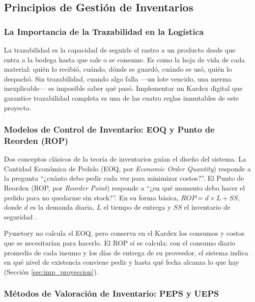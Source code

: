 \subsection{Principios de Gestión de Inventarios}
\label{sec:principios_gestion}

\subsubsection{La Importancia de la Trazabilidad en la Logística}
\label{sssec:trazabilidad}

La trazabilidad es la capacidad de seguirle el rastro a un producto desde que entra a la bodega hasta que sale o se consume. Es como la hoja de vida de cada material: quién lo recibió, cuándo, dónde se guardó, cuándo se usó, quién lo despachó. Sin trazabilidad, cuando algo falla ---un lote vencido, una merma inexplicable--- es imposible saber qué pasó. Implementar un Kardex digital que garantice trazabilidad completa es una de las cuatro reglas inmutables de este proyecto.

\subsubsection{Modelos de Control de Inventario: EOQ y Punto de Reorden (ROP)}
\label{sssec:eoq_rop}

Dos conceptos clásicos de la teoría de inventarios guían el diseño del sistema. La Cantidad Económica de Pedido (EOQ, por \textit{Economic Order Quantity}) responde a la pregunta ``¿cuánto debo pedir cada vez para minimizar costos?''. El Punto de Reorden (ROP, por \textit{Reorder Point}) responde a ``¿en qué momento debo hacer el pedido para no quedarme sin stock?''. En su forma básica, $ROP = d \times L + SS$, donde $d$ es la demanda diaria, $L$ el tiempo de entrega y $SS$ el inventario de seguridad \cite{ballou2004logistica}.

Pymetory no calcula el EOQ, pero conserva en el Kardex los consumos y costos que se necesitarían para hacerlo. El ROP sí se calcula: con el consumo diario promedio de cada insumo y los días de entrega de su proveedor, el sistema indica en qué nivel de existencia conviene pedir y hasta qué fecha alcanza lo que hay (Sección \ref{sec:imp_proyeccion}).

\subsubsection{Métodos de Valoración de Inventario: PEPS y UEPS}
\label{sssec:peps_ueps}

